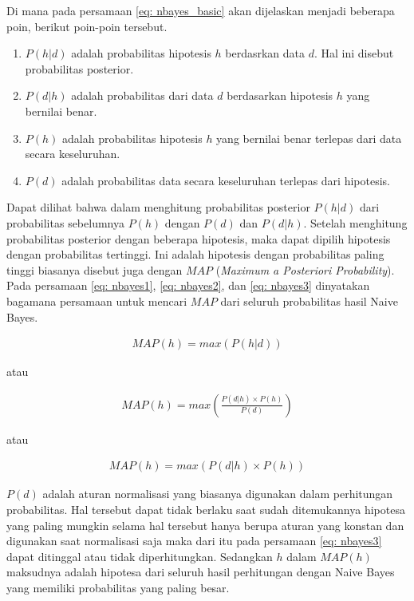 Di mana pada persamaan \ref{eq: nbayes_basic} akan dijelaskan menjadi beberapa poin, berikut poin-poin tersebut.

\begin{enumerate}
	\item $P(h|d)$ adalah probabilitas hipotesis $h$ berdasrkan data $d$. Hal ini disebut probabilitas posterior.
	\item $P(d|h)$ adalah probabilitas dari data $d$ berdasarkan hipotesis $h$ yang bernilai benar.
	\item $P(h)$ adalah probabilitas hipotesis $h$ yang bernilai benar terlepas dari data secara keseluruhan.
	\item $P(d)$ adalah probabilitas data secara keseluruhan terlepas dari hipotesis.
\end{enumerate}

Dapat dilihat bahwa dalam menghitung probabilitas posterior $P(h|d)$ dari probabilitas sebelumnya $P(h)$ dengan $P(d)$ dan $P(d|h)$. Setelah menghitung probabilitas posterior dengan beberapa hipotesis, maka dapat dipilih hipotesis dengan probabilitas tertinggi. Ini adalah hipotesis dengan probabilitas paling tinggi biasanya disebut juga dengan $MAP$ (\textit{Maximum a Posteriori Probability}). Pada persamaan \ref{eq: nbayes1}, \ref{eq: nbayes2}, dan \ref{eq: nbayes3} dinyatakan bagamana persamaan untuk mencari $MAP$ dari seluruh probabilitas hasil Naive Bayes.
\vspace{1ex}

\begin{equation}\label{eq: nbayes1}
\begin{split}
MAP(h) = max(P(h|d))
\end{split}
\end{equation}

\noindent atau

\begin{equation}\label{eq: nbayes2}
\begin{split}
MAP(h) = max\left(\frac{P(d|h) \times P(h)}{P(d)} \right)
\end{split}
\end{equation}

\noindent atau

\begin{equation}\label{eq: nbayes3}
\begin{split}
MAP(h) = max(P(d|h) \times P(h))
\end{split}
\end{equation}

$P(d)$ adalah aturan normalisasi yang biasanya digunakan dalam perhitungan probabilitas. Hal tersebut dapat tidak berlaku saat sudah ditemukannya hipotesa yang paling mungkin selama hal tersebut hanya berupa aturan yang konstan dan digunakan saat normalisasi saja maka dari itu pada persamaan \ref{eq: nbayes3} dapat ditinggal atau tidak diperhitungkan. Sedangkan $h$ dalam $MAP(h)$ maksudnya adalah hipotesa dari seluruh hasil perhitungan dengan Naive Bayes yang memiliki probabilitas yang paling besar.
\vspace{1ex}

